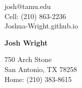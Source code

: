 \documentclass[12pt]{article}
\begin{document}

\noindent
\begin{minipage}{0.3\linewidth}
\begin{flushleft}
josh@tamu.edu\\
Cell: (210) 863-2236\\
Joshua-Wright.github.io
\end{flushleft}
\end{minipage}
\hfill
\begin{minipage}{0.3\linewidth}
\begin{center}
{\Huge\textbf{Josh Wright}}
\end{center}
\end{minipage}
\hfill
\begin{minipage}{0.3\linewidth}
\begin{flushright}
750 Arch Stone\\
San Antonio, TX 78258 \\
Home: (210) 383-8615
\end{flushright}
\end{minipage}
\vspace{-4px}
\end{document}
